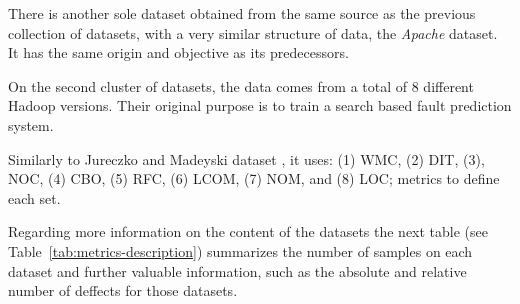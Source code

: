 There is another sole dataset obtained from the same source as the previous 
collection of datasets, with a very similar structure of data, the 
\textit{Apache} dataset. It has the same origin and objective as its 
predecessors.

On the second cluster of datasets, the data comes from a total of 8 different
Hadoop versions. Their original purpose is to train a search based fault 
prediction system. 

Similarly to Jureczko and Madeyski dataset \cite{Jureczko2010, MadeyskiJ2015},
it uses: (1) WMC, (2) DIT, (3), NOC, (4) CBO, (5) RFC, (6) LCOM, (7) NOM, and
(8) LOC; metrics to define each set.

Regarding more information on the content of the datasets the next table (see
Table~\ref{tab:metrics-description}) summarizes the number of samples on each 
dataset and further valuable information, such as the absolute and
relative number of deffects for those datasets.

